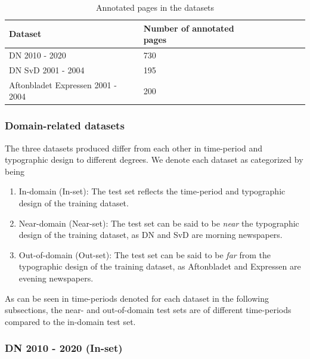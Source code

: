 \documentclass[oneside, english, bibtex]{kththesis}
\begin{document}
\begin{table}[H]
  \begin{center}
    \caption{Annotated pages in the datasets}
    \label{tab:pagedist}
    \begin{tabular}{l|l|l|l|l|l|l} %
    \textbf{Dataset} & \textbf{Number of annotated pages} \\
    \hline
    DN 2010 - 2020 & 730 \\    \hline
    DN SvD 2001 - 2004 & 195 \\    \hline
    Aftonbladet Expressen 2001 - 2004 & 200  \\    \hline
    \end{tabular}
  \end{center}
\end{table}

\subsubsection{Domain-related datasets}
\label{subsub:domain}

The three datasets produced differ from each other in time-period and typographic design to different degrees.
We denote each dataset as categorized by being 

\begin{enumerate}
\item In-domain (In-set): The test set reflects the time-period and typographic design of the training dataset.
\item Near-domain (Near-set): The test set can be said to be \textit{near} the typographic design of the training dataset, as DN and SvD are morning newspapers.
\item Out-of-domain (Out-set): The test set can be said to be \textit{far} from the typographic design of the training dataset, as Aftonbladet and Expressen are evening newspapers.
\end{enumerate} 

As can be seen in time-periods denoted for each dataset in the following subsections, the near- and out-of-domain test sets are of different time-periods compared to the in-domain test set.

\subsubsection{DN 2010 - 2020 (In-set)}
\label{subsub:inset}
\end{document}
